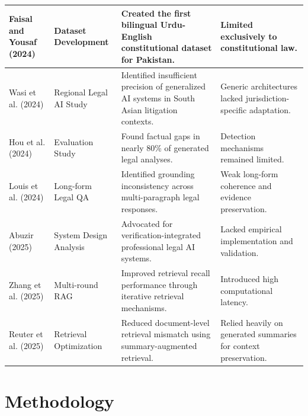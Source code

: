 \begin{table}[t]
\begin{tabularx}{\textwidth}{|>{\raggedright\arraybackslash}p{2.5cm}|>{\raggedright\arraybackslash}p{3.0cm}|>{\raggedright\arraybackslash}X|>{\raggedright\arraybackslash}X|}
Faisal and Yousaf (2024) & Dataset Development & Created the first bilingual Urdu-English constitutional dataset for Pakistan. & Limited exclusively to constitutional law. \\
\hline

Wasi et al. (2024) & Regional Legal AI Study & Identified insufficient precision of generalized AI systems in South Asian litigation contexts. & Generic architectures lacked jurisdiction-specific adaptation. \\
\hline

Hou et al. (2024) & Evaluation Study & Found factual gaps in nearly 80\% of generated legal analyses. & Detection mechanisms remained limited. \\
\hline

Louis et al. (2024) & Long-form Legal QA & Identified grounding inconsistency across multi-paragraph legal responses. & Weak long-form coherence and evidence preservation. \\
\hline

Abuzir (2025) & System Design Analysis & Advocated for verification-integrated professional legal AI systems. & Lacked empirical implementation and validation. \\
\hline

Zhang et al. (2025) & Multi-round RAG & Improved retrieval recall performance through iterative retrieval mechanisms. & Introduced high computational latency. \\
\hline

Reuter et al. (2025) & Retrieval Optimization & Reduced document-level retrieval mismatch using summary-augmented retrieval. & Relied heavily on generated summaries for context preservation. \\
\hline

\end{tabularx}
\end{table}

\section{Methodology}
\label{sec:method}

